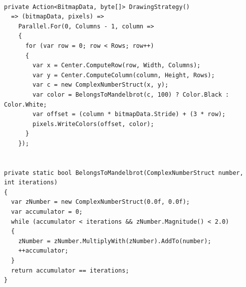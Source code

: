\begin{lstlisting}[language={[sharp]c}, style=sharpcstyle, caption={Parallel Mandelbrot algorithm using value types}, label={lst:ParStructMandelbrot}]

private Action<BitmapData, byte[]> DrawingStrategy()
  => (bitmapData, pixels) =>
    Parallel.For(0, Columns - 1, column =>
    {
      for (var row = 0; row < Rows; row++)
      {
        var x = Center.ComputeRow(row, Width, Columns);
        var y = Center.ComputeColumn(column, Height, Rows);
        var c = new ComplexNumberStruct(x, y);
        var color = BelongsToMandelbrot(c, 100) ? Color.Black : Color.White;
        var offset = (column * bitmapData.Stride) + (3 * row);
        pixels.WriteColors(offset, color);
      }
    });


private static bool BelongsToMandelbrot(ComplexNumberStruct number, int iterations)
{
  var zNumber = new ComplexNumberStruct(0.0f, 0.0f);
  var accumulator = 0;
  while (accumulator < iterations && zNumber.Magnitude() < 2.0)
  {
    zNumber = zNumber.MultiplyWith(zNumber).AddTo(number);
    ++accumulator;
  }
  return accumulator == iterations;
}

\end{lstlisting}

